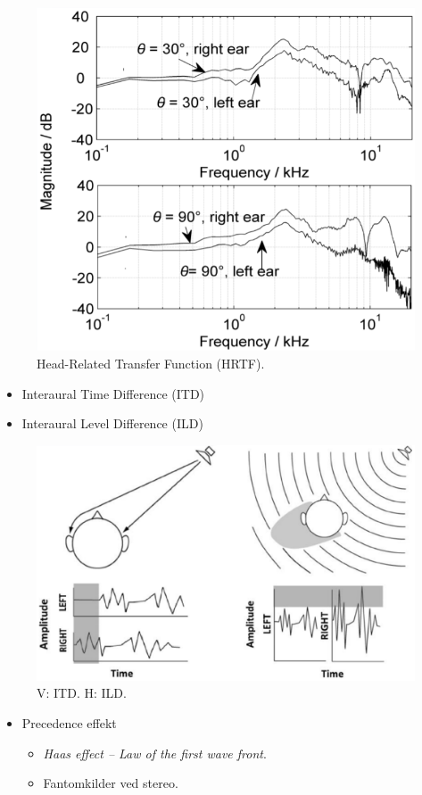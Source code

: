 \begin{figure} [H]
	\centering
	\includegraphics[width=.8\linewidth]{graphics/48.png}
	\caption{Head-Related Transfer Function (HRTF).}
	\label{fig:48}
\end{figure}

\begin{itemize}
	\item Interaural Time Difference (ITD) 
	\item Interaural Level Difference (ILD)
\end{itemize}


\begin{figure} [H]
	\centering
	\includegraphics[width=.8\linewidth]{graphics/47.png}
	\caption{V: ITD. H: ILD.}
	\label{fig:47}
\end{figure}

\begin{itemize}
	\item Precedence effekt
	\begin{itemize}
		\item \textit{Haas effect – Law of the first wave front}.
		\item Fantomkilder ved stereo.
	\end{itemize}
\end{itemize}

